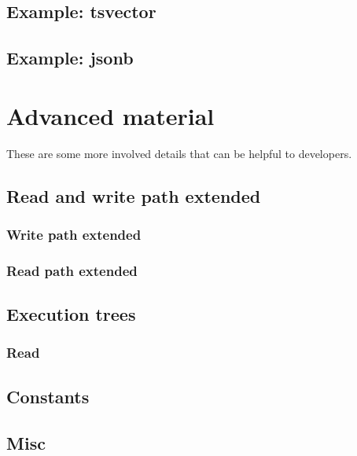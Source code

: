\documentclass[11pt]{article}
\begin{document}
\hypertarget{example-tsvector}{%
\subsection{Example: tsvector}\label{example-tsvector}}

\hypertarget{example-jsonb}{%
\subsection{Example: jsonb}\label{example-jsonb}}

\hypertarget{advanced-material}{%
\section{Advanced material}\label{advanced-material}}

These are some more involved details that can be helpful to developers.

\hypertarget{read-and-write-path-extended}{%
\subsection{Read and write path
extended}\label{read-and-write-path-extended}}

\hypertarget{write-path-extended}{%
\subsubsection{Write path extended}\label{write-path-extended}}

\hypertarget{read-path-extended}{%
\subsubsection{Read path extended}\label{read-path-extended}}

\hypertarget{execution-trees}{%
\subsection{Execution trees}\label{execution-trees}}

\hypertarget{read}{%
\subsubsection{Read}\label{read}}

\hypertarget{constants}{%
\subsection{Constants}\label{constants}}

\hypertarget{misc}{%
\subsection{Misc}\label{misc}}
\end{document}
